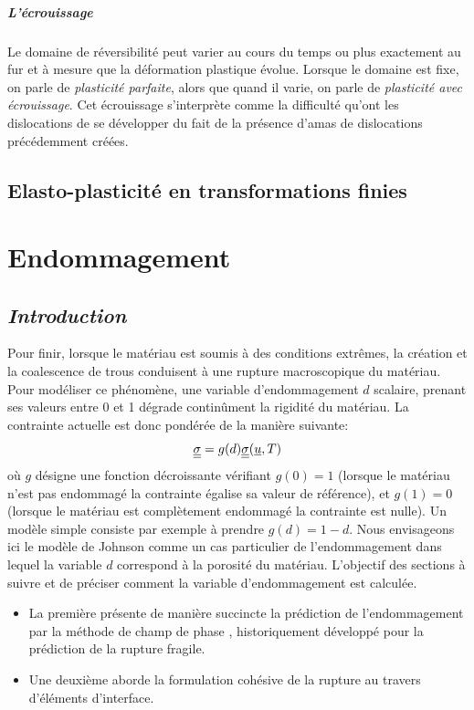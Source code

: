 \documentclass[10pt]{book}
\begin{document}
\paragraph{L'écrouissage} Le domaine de réversibilité peut varier au cours du temps ou plus exactement au fur et à mesure que la déformation plastique évolue. Lorsque le domaine est fixe, on parle de \emph{plasticité parfaite}, alors que quand il varie, on parle de \emph{plasticité avec écrouissage}. Cet écrouissage s'interprète comme la difficulté qu'ont les dislocations de se développer du fait de la présence d'amas de dislocations précédemment créées.
\section{Elasto-plasticité en transformations finies}\label{Section:Elasto-plasticité en transformations finies}
\newcommand{\argmin}{\mathrm{arg}\,\min}
\newcommand{\PPot}{\Phi}
\chapter{Endommagement}\label{Chapitre:Endommagement}
\section*{\emph{Introduction}}
Pour finir, lorsque le matériau est soumis à des conditions extrêmes, la création et la coalescence de trous conduisent à une rupture macroscopique du matériau. Pour modéliser ce phénomène, une variable d'endommagement $d$ scalaire, prenant ses valeurs entre 0 et 1 dégrade continûment la rigidité du matériau. La contrainte actuelle est donc pondérée de la manière suivante:
$$\underline{\underline{\sigma}} = g(d)\underline{\underline{\sigma}}(\underline{u},T)$$
où $g$ désigne une fonction décroissante vérifiant $g(0)=1$ (lorsque le matériau n'est pas endommagé la contrainte égalise sa valeur de référence), et $g(1)=0$ (lorsque le matériau est complètement endommagé la contrainte est nulle). Un modèle simple consiste par exemple à prendre  $g(d)=1-d$.
Nous envisageons ici le modèle de Johnson comme un cas particulier de l'endommagement dans lequel la variable $d$ correspond à la porosité du matériau. L'objectif des sections à suivre et de préciser comment la variable d'endommagement est calculée.
\begin{itemize}
\item La première  présente de manière succincte la prédiction de l'endommagement par la méthode de \og champ de phase \fg{}, historiquement développé pour la prédiction de la rupture fragile.
\item Une deuxième  aborde la formulation cohésive de la rupture au travers d'éléments d'interface.
\end{itemize}
\end{document}
